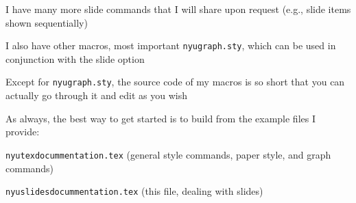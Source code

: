\documentclass[11pt]{article}
\begin{document}
\begin{list1}
\item I have many more slide commands that I will share upon request (e.g., slide items shown  sequentially)
\item I also have other macros, most important \verb|nyugraph.sty|, which can be used in conjunction with the slide option
\item Except for \verb|nyugraph.sty|, the source code of my macros is so short that you can actually go through it and edit as you wish
\item As always, the best way to get started is to build from the example files I provide:
\begin{list2}
\item \verb|nyutexdocummentation.tex| (general style commands, paper style, and graph commands)
\item \verb|nyuslidesdocummentation.tex| (this file, dealing with slides)
\end{list2}
\end{list1}
\end{document}
